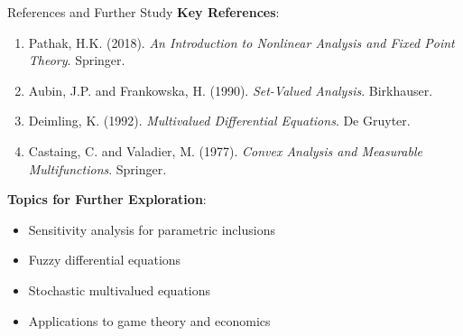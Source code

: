 \documentclass[aspectratio=169,10pt]{beamer}
\begin{document}
\begin{frame}{References and Further Study}
    \textbf{Key References}:
    \begin{enumerate}
        \item Pathak, H.K. (2018). \textit{An Introduction to Nonlinear Analysis and Fixed Point Theory}. Springer.
        \item Aubin, J.P. and Frankowska, H. (1990). \textit{Set-Valued Analysis}. Birkhauser.
        \item Deimling, K. (1992). \textit{Multivalued Differential Equations}. De Gruyter.
        \item Castaing, C. and Valadier, M. (1977). \textit{Convex Analysis and Measurable Multifunctions}. Springer.
    \end{enumerate}

    \vspace{0.4cm}
    \textbf{Topics for Further Exploration}:
    \begin{itemize}
        \item Sensitivity analysis for parametric inclusions
        \item Fuzzy differential equations
        \item Stochastic multivalued equations
        \item Applications to game theory and economics
    \end{itemize}
\end{frame}
\end{document}
